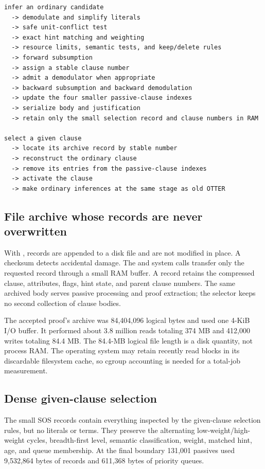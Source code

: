 \documentclass[11pt]{article}
\newcommand{\setting}[1]{\texttt{\detokenize{#1}}}
\begin{document}
\begin{lstlisting}
infer an ordinary candidate
  -> demodulate and simplify literals
  -> safe unit-conflict test
  -> exact hint matching and weighting
  -> resource limits, semantic tests, and keep/delete rules
  -> forward subsumption
  -> assign a stable clause number
  -> admit a demodulator when appropriate
  -> backward subsumption and backward demodulation
  -> update the four smaller passive-clause indexes
  -> serialize body and justification
  -> retain only the small selection record and clause numbers in RAM

select a given clause
  -> locate its archive record by stable number
  -> reconstruct the ordinary clause
  -> remove its entries from the passive-clause indexes
  -> activate the clause
  -> make ordinary inferences at the same stage as old OTTER
\end{lstlisting}

\subsection{File archive whose records are never overwritten}

With \setting{ancestor_store=file}, records are appended to a disk file and are
not modified in place.  A checksum detects accidental damage.  The
\setting{pread} and \setting{pwrite} system calls transfer only the requested
record through a small RAM buffer.  A record retains the compressed clause,
attributes, flags, hint state, and parent clause numbers.  The same archived
body serves passive processing and proof extraction; the selector keeps no
second collection of clause bodies.

The accepted proof's archive was 84,404,096 logical bytes and used one 4-KiB I/O
buffer.  It performed about 3.8 million reads totaling 374 MB and 412,000 writes
totaling 84.4 MB.  The 84.4-MB logical file length is a disk quantity, not
process RAM.  The operating system may retain recently read blocks in its
discardable filesystem cache, so cgroup accounting is needed for a total-job
measurement.

\subsection{Dense given-clause selection}

The small SOS records contain everything inspected by the given-clause
selection rules, but no literals or terms.  They preserve the alternating
low-weight/high-weight cycles, breadth-first level, semantic classification,
weight, matched hint, age, and queue membership.  At the final boundary 131,001
passives used 9,532,864 bytes of records and 611,368 bytes of priority queues.
\end{document}
